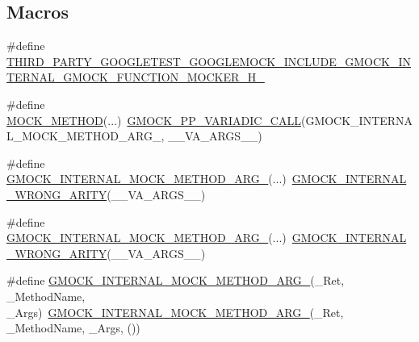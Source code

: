 \subsection*{Macros}
\begin{DoxyCompactItemize}
\item 
\#define \mbox{\hyperlink{_obj__test_2lib_2googletest-master_2googlemock_2include_2gmock_2gmock-function-mocker_8h_a790cf5a76ad32864f1e29495e30d2df2}{T\+H\+I\+R\+D\+\_\+\+P\+A\+R\+T\+Y\+\_\+\+G\+O\+O\+G\+L\+E\+T\+E\+S\+T\+\_\+\+G\+O\+O\+G\+L\+E\+M\+O\+C\+K\+\_\+\+I\+N\+C\+L\+U\+D\+E\+\_\+\+G\+M\+O\+C\+K\+\_\+\+I\+N\+T\+E\+R\+N\+A\+L\+\_\+\+G\+M\+O\+C\+K\+\_\+\+F\+U\+N\+C\+T\+I\+O\+N\+\_\+\+M\+O\+C\+K\+E\+R\+\_\+\+H\+\_\+}}
\item 
\#define \mbox{\hyperlink{_obj__test_2lib_2googletest-master_2googlemock_2include_2gmock_2gmock-function-mocker_8h_a05ffc29d0784b131ee178da190d31397}{M\+O\+C\+K\+\_\+\+M\+E\+T\+H\+OD}}(...)~\mbox{\hyperlink{_obj__test_2lib_2googletest-master_2googlemock_2include_2gmock_2internal_2gmock-pp_8h_a4dd8715f753c7c3957f7185acf609e55}{G\+M\+O\+C\+K\+\_\+\+P\+P\+\_\+\+V\+A\+R\+I\+A\+D\+I\+C\+\_\+\+C\+A\+LL}}(G\+M\+O\+C\+K\+\_\+\+I\+N\+T\+E\+R\+N\+A\+L\+\_\+\+M\+O\+C\+K\+\_\+\+M\+E\+T\+H\+O\+D\+\_\+\+A\+R\+G\+\_\+, \+\_\+\+\_\+\+V\+A\+\_\+\+A\+R\+G\+S\+\_\+\+\_\+)
\item 
\#define \mbox{\hyperlink{_obj__test_2lib_2googletest-master_2googlemock_2include_2gmock_2gmock-function-mocker_8h_aa4f34502611b33621e18725a56f4d011}{G\+M\+O\+C\+K\+\_\+\+I\+N\+T\+E\+R\+N\+A\+L\+\_\+\+M\+O\+C\+K\+\_\+\+M\+E\+T\+H\+O\+D\+\_\+\+A\+R\+G\+\_}}(...)~\mbox{\hyperlink{_obj__test_2lib_2googletest-master_2googlemock_2include_2gmock_2gmock-function-mocker_8h_a592456f4bfcfc9a9a3a6b1482ed569f4}{G\+M\+O\+C\+K\+\_\+\+I\+N\+T\+E\+R\+N\+A\+L\+\_\+\+W\+R\+O\+N\+G\+\_\+\+A\+R\+I\+TY}}(\+\_\+\+\_\+\+V\+A\+\_\+\+A\+R\+G\+S\+\_\+\+\_\+)
\item 
\#define \mbox{\hyperlink{_obj__test_2lib_2googletest-master_2googlemock_2include_2gmock_2gmock-function-mocker_8h_a4a857a2d13828d2b65ac09eb47f3d36c}{G\+M\+O\+C\+K\+\_\+\+I\+N\+T\+E\+R\+N\+A\+L\+\_\+\+M\+O\+C\+K\+\_\+\+M\+E\+T\+H\+O\+D\+\_\+\+A\+R\+G\+\_}}(...)~\mbox{\hyperlink{_obj__test_2lib_2googletest-master_2googlemock_2include_2gmock_2gmock-function-mocker_8h_a592456f4bfcfc9a9a3a6b1482ed569f4}{G\+M\+O\+C\+K\+\_\+\+I\+N\+T\+E\+R\+N\+A\+L\+\_\+\+W\+R\+O\+N\+G\+\_\+\+A\+R\+I\+TY}}(\+\_\+\+\_\+\+V\+A\+\_\+\+A\+R\+G\+S\+\_\+\+\_\+)
\item 
\#define \mbox{\hyperlink{_obj__test_2lib_2googletest-master_2googlemock_2include_2gmock_2gmock-function-mocker_8h_a7af2c00ea7b5cdbdf7129e5d9296fdad}{G\+M\+O\+C\+K\+\_\+\+I\+N\+T\+E\+R\+N\+A\+L\+\_\+\+M\+O\+C\+K\+\_\+\+M\+E\+T\+H\+O\+D\+\_\+\+A\+R\+G\+\_}}(\+\_\+\+Ret,  \+\_\+\+Method\+Name,  \+\_\+\+Args)~\mbox{\hyperlink{_obj__test_2lib_2googletest-master_2googlemock_2include_2gmock_2gmock-function-mocker_8h_ad8a2523f8167f8c85b082c8c65f31b87}{G\+M\+O\+C\+K\+\_\+\+I\+N\+T\+E\+R\+N\+A\+L\+\_\+\+M\+O\+C\+K\+\_\+\+M\+E\+T\+H\+O\+D\+\_\+\+A\+R\+G\+\_}}(\+\_\+\+Ret, \+\_\+\+Method\+Name, \+\_\+\+Args, ())

\end{DoxyCompactItemize}
